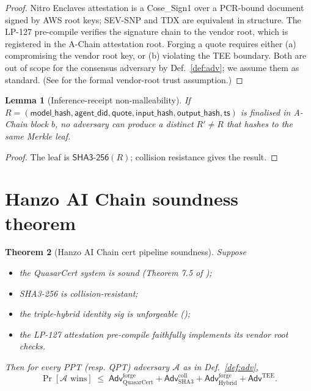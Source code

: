 \documentclass[11pt]{article}
\newtheorem{theorem}{Theorem}
\newtheorem{lemma}[theorem]{Lemma}
\begin{document}
\begin{proof}
Nitro Enclaves attestation is a Cose\_Sign1 over a PCR-bound document
signed by AWS root keys; SEV-SNP and TDX are equivalent in structure.
The LP-127 pre-compile verifies the signature chain to the vendor
root, which is registered in the A-Chain attestation root. Forging a
quote requires either (a) compromising the vendor root key, or (b)
violating the TEE boundary. Both are out of scope for the consensus
adversary by Def.~\ref{def:adv}; we assume them as standard. (See
\cite{lp127} for the formal vendor-root trust assumption.)
\end{proof}

\begin{lemma}[Inference-receipt non-malleability]
\label{lem:nonmall}
If $R = (\mathsf{model\_hash}, \mathsf{agent\_did}, \mathsf{quote},
\mathsf{input\_hash}, \mathsf{output\_hash}, \mathsf{ts})$ is finalised
in A-Chain block $b$, no adversary can produce a distinct
$R' \neq R$ that hashes to the same Merkle leaf.
\end{lemma}

\begin{proof}
The leaf is $\mathsf{SHA3\text{-}256}(R)$; collision resistance gives
the result.
\end{proof}

\section{Hanzo AI Chain soundness theorem}
\label{sec:soundness}

\begin{theorem}[Hanzo AI Chain cert pipeline soundness]
\label{thm:soundness}
Suppose
\begin{itemize}[nosep]
  \item the QuasarCert system is sound (Theorem 7.5 of
        \cite{quasar-cert});
  \item SHA3-256 is collision-resistant;
  \item the triple-hybrid identity sig is unforgeable
        (\cite{lux-lean-hybrid});
  \item the LP-127 attestation pre-compile faithfully implements its
        vendor root checks.
\end{itemize}
Then for every PPT (resp. QPT) adversary $\mathcal{A}$ as in
Def.~\ref{def:adv},
\[
  \Pr[\mathcal{A} \text{ wins}] \;\leq\;
  \mathsf{Adv}^{\mathrm{forge}}_{\mathrm{QuasarCert}} +
  \mathsf{Adv}^{\mathrm{coll}}_{\mathrm{SHA3}} +
  \mathsf{Adv}^{\mathrm{forge}}_{\mathrm{Hybrid}} +
  \mathsf{Adv}^{\mathrm{TEE}}.
\]
\end{theorem}
\end{document}
